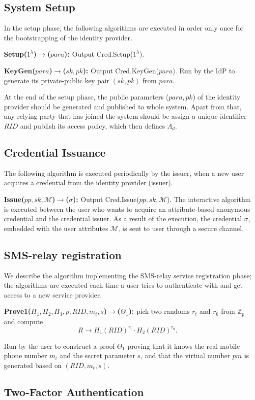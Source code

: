 \subsection{System Setup}
In the setup phase, the following algorithms are executed in order only once for the bootstrapping of the identity provider. 
\begin{list}{}{}
    \item{\bf{Setup($1^{\lambda}$)$\rightarrow$($para$): }} Output \textsf{Cred.Setup($1^\lambda$)}.\\
    \item{\bf{KeyGen($para$)$\rightarrow$($sk, pk$): }}Output \textsf{Cred.KeyGen($para$)}. Run by the IdP to generate its private-public key pair $(sk, pk)$ from $para$.\\    
\end{list}
At the end of the setup phase, the public parameters ($para, pk$) of the identity provider should be generated and published to whole system. Apart from that, any relying party that has joined the system should be assign a unique identifier $RID$ and publish its access policy, which then defines $A_d$.
\subsection{Credential Issuance}
The following algorithm is executed periodically by the issuer, when a new user acquires a credential from the identity provider (issuer).
\begin{list}{}{}
    \item{\bf{Issue($pp, sk, \mathcal{M}$)$\rightarrow$($\sigma$): }} Output \textsf{Cred.Issue($pp, sk, \mathcal{M}$)}. The interactive algorithm is executed between the user who wants to acquire an attribute-based anonymous credential and the credential issuer. As a result of the execution, the credential $\sigma$, embedded with the user attributes $\mathcal{M}$, is sent to user through a secure channel.
\end{list}
\subsection{SMS-relay registration}
We describe the algorithm implementing the SMS-relay service registration phase; the algorithms are executed each time a user tries to authenticate with and get access to a new service provider.
\begin{list}{}{}
    \item{\bf{Prove1($H_1, H_2, H_3, p, RID, m_t, s$)$\rightarrow$($\Theta_1$): }}
    pick two randoms $r_t$ and $r_0$ from $\mathbb{Z}_p$ and compute $$R\rightarrow H_1(RID)^{r_t}\cdot H_2(RID)^{r_0}.$$
    
    Run by the user to construct a proof $\Theta_1$ proving that it knows the real mobile phone number $m_t$ and the secret parameter $s$, and that the virtual number $pm$ is generated based on $(RID, m_t, s)$.
\end{list}
\subsection{Two-Factor Authentication}
